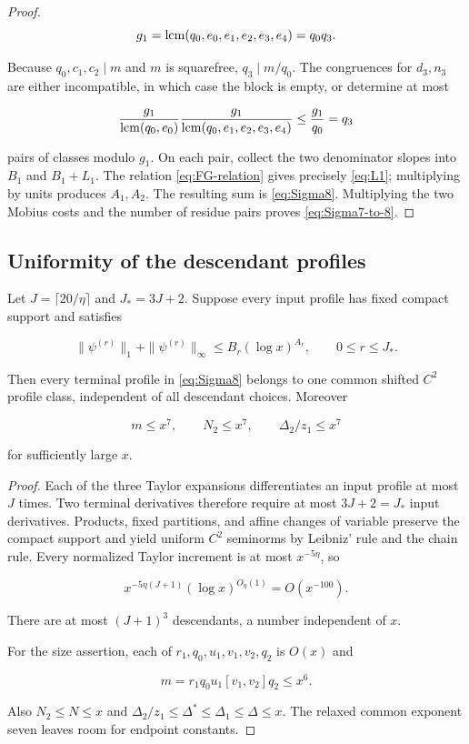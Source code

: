 \begin{proof}
\[
 g_1=\operatorname{lcm}(q_0,e_0,e_1,e_2,e_3,e_4)=q_0q_3.
\]

Because $q_0,c_1,c_2\mid m$ and $m$ is squarefree,
$q_3\mid m/q_0$.  The congruences for $d_3,n_3$ are either incompatible,
in which case the block is empty, or determine at most

\[
 \frac{g_1}{\operatorname{lcm}(q_0,e_0)}
 \frac{g_1}{\operatorname{lcm}(q_0,e_1,e_2,e_3,e_4)}
 \le\frac{g_1}{q_0}=q_3
\]

pairs of classes modulo $g_1$.  On each pair, collect the two denominator
slopes into $B_1$ and $B_1+L_1$.  The relation
\cref{eq:FG-relation} gives precisely \cref{eq:L1}; multiplying by units
produces $A_1,A_2$.  The resulting sum is \cref{eq:Sigma8}.  Multiplying
the two Mobius costs and the number of residue pairs proves
\cref{eq:Sigma7-to-8}.
\end{proof}

\subsection{Uniformity of the descendant profiles}

\begin{lemma}\label{lem:finite-jet}
Let $J=\lceil20/\eta\rceil$ and $J_*=3J+2$.  Suppose every input profile
has fixed compact support and satisfies

\begin{equation}\label{eq:input-jets}
 \|\psi^{(r)}\|_1+\|\psi^{(r)}\|_\infty
 \le B_r(\log x)^{A_r},\qquad 0\le r\le J_*.
\end{equation}

Then every terminal profile in \cref{eq:Sigma8} belongs to one common
shifted $C^2$ profile class, independent of all descendant choices.
Moreover

\begin{equation}\label{eq:terminal-polynomial-size}
 m\le x^7,\qquad N_2\le x^7,\qquad \Delta_2/z_1\le x^7
\end{equation}

for sufficiently large $x$.
\end{lemma}

\begin{proof}
Each of the three Taylor expansions differentiates an input profile at most
$J$ times.  Two terminal derivatives therefore require at most
$3J+2=J_*$ input derivatives.  Products, fixed partitions, and affine
changes of variable preserve the compact support and yield uniform $C^2$
seminorms by Leibniz' rule and the chain rule.  Every normalized Taylor
increment is at most $x^{-5\eta}$, so

\[
 x^{-5\eta(J+1)}(\log x)^{O_\eta(1)}=O(x^{-100}).
\]

There are at most $(J+1)^3$ descendants, a number independent of $x$.

For the size assertion, each of
$r_1,q_0,u_1,v_1,v_2,q_2$ is $O(x)$ and

\[
 m=r_1q_0u_1[v_1,v_2]q_2\le x^6.
\]

Also $N_2\le N\le x$ and
$\Delta_2/z_1\le\Delta^*\le\Delta_1\le\Delta\le x$.
The relaxed common exponent seven leaves room for endpoint constants.
\end{proof}

